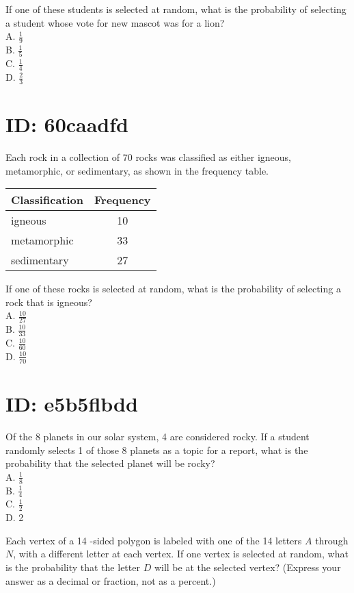 If one of these students is selected at random, what is the probability of selecting a student whose vote for new mascot was for a lion?\\
A. $\frac{1}{9}$\\
B. $\frac{1}{5}$\\
C. $\frac{1}{4}$\\
D. $\frac{2}{3}$

\section*{ID: 60caadfd}
Each rock in a collection of 70 rocks was classified as either igneous, metamorphic, or sedimentary, as shown in the frequency table.

\begin{center}
\begin{tabular}{|l|c|}
\hline
Classification & Frequency \\
\hline
igneous & 10 \\
\hline
metamorphic & 33 \\
\hline
sedimentary & 27 \\
\hline
\end{tabular}
\end{center}

If one of these rocks is selected at random, what is the probability of selecting a rock that is igneous?\\
A. $\frac{10}{27}$\\
B. $\frac{10}{33}$\\
C. $\frac{10}{60}$\\
D. $\frac{10}{70}$

\section*{ID: e5b5flbdd}
Of the 8 planets in our solar system, 4 are considered rocky. If a student randomly selects 1 of those 8 planets as a topic for a report, what is the probability that the selected planet will be rocky?\\
A. $\frac{1}{8}$\\
B. $\frac{1}{4}$\\
C. $\frac{1}{2}$\\
D. 2

Each vertex of a 14 -sided polygon is labeled with one of the 14 letters $A$ through $N$, with a different letter at each vertex. If one vertex is selected at random, what is the probability that the letter $D$ will be at the selected vertex? (Express your answer as a decimal or fraction, not as a percent.)

